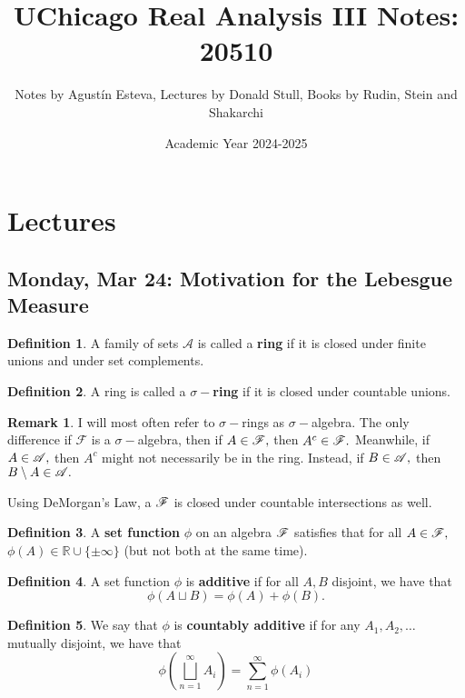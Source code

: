 \documentclass[10pt, oneside]{article}
\title{UChicago Real Analysis III Notes: 20510}
\author{Notes by Agustín Esteva, Lectures by Donald Stull, Books by Rudin, Stein and Shakarchi}
\date{Academic Year 2024-2025}
\newcommand{\bbR}{\mathbb{R}}
\newcommand{\sm}{\setminus}
\theoremstyle{definition}
\newtheorem{defn}{Definition}
\newtheorem{rem}{Remark}
\begin{document}
\maketitle
\tableofcontents

\vspace{.25in}


\newpage
\section{Lectures}

\subsection{Monday, Mar 24: Motivation for the Lebesgue Measure}
\begin{defn}
    A family of sets $\mathcal{A}$ is called a \textbf{ring} if it is closed under finite unions and under set complements. 
\end{defn}
\begin{defn}
    A ring is called a \textbf{$\sigma-$ring} if it is closed under countable unions.
\end{defn}
\begin{rem}
    I will most often refer to $\sigma-$rings as $\sigma-$algebra. The only difference if $\mathcal{F}$ is a $\sigma-$algebra, then if $A \in \cal F,$ then $A^c \in \cal F.$ Meanwhile, if $A\in \cal A,$ then $A^c$ might not necessarily be in the ring. Instead, if $B \in \cal A,$ then $B\sm A \in \cal A.$  
\end{rem}
Using DeMorgan's Law, a $\cal F$ is closed under countable intersections as well. 
\begin{defn}
    A \textbf{set function} $\phi$ on an algebra $\cal F$ satisfies that for all $A \in \cal F,$ $\phi(A) \in \bbR \cup \{\pm \infty\}$ (but not both at the same time).
\end{defn}
\begin{defn}
A set function $\phi$ is \textbf{additive} if for all $A,B$ disjoint, we have that 
\[\phi(A\sqcup B) = \phi(A) + \phi(B).\]
\end{defn}
\begin{defn}
    We say that $\phi$ is \textbf{countably additive} if for any $A_1, A_2, \dots$ mutually disjoint, we have that 
    \[\phi\left(\bigsqcup_{n=1}^\infty A_i\right) = \sum_{n=1}^\infty \phi(A_i)\]
\end{defn}
\end{document}
